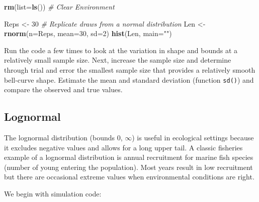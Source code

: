 \documentclass[
]{krantz}
\makeatletter
\newenvironment{Shaded}{\begin{snugshade}}{\end{snugshade}}
\newcommand{\AttributeTok}[1]{\textcolor[rgb]{0.27,0.27,0.27}{#1}}
\newcommand{\CommentTok}[1]{\textcolor[rgb]{0.37,0.37,0.37}{\textit{#1}}}
\newcommand{\DecValTok}[1]{\textcolor[rgb]{0.06,0.06,0.06}{#1}}
\newcommand{\FunctionTok}[1]{\textcolor[rgb]{0.27,0.27,0.27}{\textbf{#1}}}
\newcommand{\NormalTok}[1]{#1}
\newcommand{\OtherTok}[1]{\textcolor[rgb]{0.37,0.37,0.37}{#1}}
\newcommand{\StringTok}[1]{\textcolor[rgb]{0.5,0.5,0.5}{#1}}
\newenvironment{kframe}{%
\medskip{}
\setlength{\fboxsep}{.8em}
 \def\at@end@of@kframe{}%
 \ifinner\ifhmode%
  \def\at@end@of@kframe{\end{minipage}}%
  \begin{minipage}{\columnwidth}%
 \fi\fi%
 \def\FrameCommand##1{\hskip\@totalleftmargin \hskip-\fboxsep
 \colorbox{shadecolor}{##1}\hskip-\fboxsep
     \hskip-\linewidth \hskip-\@totalleftmargin \hskip\columnwidth}%
 \MakeFramed {\advance\hsize-\width
   \@totalleftmargin\z@ \linewidth\hsize
   \@setminipage}}%
 {\par\unskip\endMakeFramed%
 \at@end@of@kframe}
\renewenvironment{Shaded}{\begin{kframe}}{\end{kframe}}
\makeatother
\begin{document}
\begin{Shaded}
\begin{Highlighting}[]
\FunctionTok{rm}\NormalTok{(}\AttributeTok{list=}\FunctionTok{ls}\NormalTok{()) }\CommentTok{\# Clear Environment}

\NormalTok{Reps }\OtherTok{\textless{}{-}} \DecValTok{30} \CommentTok{\# Replicate draws from a normal distribution}
\NormalTok{Len }\OtherTok{\textless{}{-}} \FunctionTok{rnorm}\NormalTok{(}\AttributeTok{n=}\NormalTok{Reps, }\AttributeTok{mean=}\DecValTok{30}\NormalTok{, }\AttributeTok{sd=}\DecValTok{2}\NormalTok{)}
\FunctionTok{hist}\NormalTok{(Len, }\AttributeTok{main=}\StringTok{""}\NormalTok{)}
\end{Highlighting}
\end{Shaded}

Run the code a few times to look at the variation in shape and bounds at a relatively small sample size. Next, increase the sample size and determine through trial and error the smallest sample size that provides a relatively smooth bell-curve shape. Estimate the mean and standard deviation (function \texttt{sd()}) and compare the observed and true values.

\hypertarget{lognormal}{%
\subsection{Lognormal}\label{lognormal}}

The lognormal distribution (bounds 0, \(\infty\)) is useful in ecological settings because it excludes negative values and allows for a long upper tail. A classic fisheries example of a lognormal distribution is annual recruitment for marine fish species (number of young entering the population). Most years result in low recruitment but there are occasional extreme values when environmental conditions are right.

We begin with simulation code:
\end{document}
